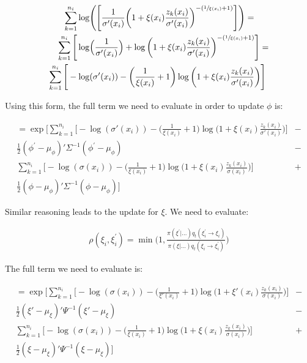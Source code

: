 \documentclass{article}
\begin{document}
\begin{align*}
\sum_{k=1}^{n_i} \log & \Bigg( \Bigg[ \frac{1}{\sigma'(x_i)} \bigg( 1 + \xi(x_i) \frac{z_k(x_i)}{\sigma'(x_i)} \bigg)^{-(\sfrac{1}{\xi(x_i)} + 1)} \Bigg] \Bigg) = \\
\sum_{k=1}^{n_i} \Bigg[ \log & \Big( \frac{1}{\sigma'(x_i)} \Big) + \log \bigg( 1 + \xi(x_i) \frac{z_k(x_i)}{\sigma'(x_i)} \bigg)^{-(\sfrac{1}{\xi(x_i)} + 1)} \Bigg] = \\
\sum_{k=1}^{n_i} \Bigg[ - \log & (\sigma'(x_i)) - \bigg( \frac{1}{\xi(x_i)} + 1 \bigg) \log \bigg( 1 + \xi(x_i) \frac{z_k(x_i)}{\sigma'(x_i)} \bigg) \Bigg]
\end{align*}

Using this form, the full term we need to evaluate in order to update $\phi$ is:

\begin{align}
= \exp \Bigg[ \sum_{k=1}^{n_i} \bigg[ - \log (\sigma'(x_i)) - \bigg( \frac{1}{\xi(x_i)} + 1 \bigg) \log \bigg( 1 + \xi(x_i) \frac{z_k(x_i)}{\sigma'(x_i)} \bigg) \bigg] & - \nonumber \\
\frac{1}{2} (\phi^{'} - \mu_\phi)' \Sigma^{-1} (\phi^{'} - \mu_\phi) & - \nonumber \\
\sum_{k=1}^{n_i} \bigg[ - \log (\sigma(x_i)) - \bigg( \frac{1}{\xi(x_i)} + 1 \bigg) \log \bigg( 1 + \xi(x_i) \frac{z_k(x_i)}{\sigma(x_i)} \bigg) \bigg] & + \nonumber \\
\frac{1}{2} (\phi - \mu_\phi)' \Sigma^{-1} (\phi - \mu_\phi) \Bigg] & \label{3eq:1a}
\end{align}

Similar reasoning leads to the update for $\xi$. We need to evaluate:

\begin{align*}
\rho(\xi_i, \xi^{'}_i) = \min \bigg (1, \frac{\pi(\xi^{'} | \dots ) q_t(\xi^{'}_i \to \xi_i)}{ \pi(\xi | \dots ) q_t(\xi_i \to \xi^{'}_i) } \bigg)
\end{align*}

The full term we need to evaluate is:

\begin{align}
= \exp \Bigg[ \sum_{k=1}^{n_i} \bigg[ - \log (\sigma(x_i)) - \bigg( \frac{1}{\xi'(x_i)} + 1 \bigg) \log \bigg( 1 + \xi'(x_i) \frac{z_k(x_i)}{\sigma(x_i)} \bigg) \bigg] & -\nonumber \\
\frac{1}{2} (\xi' - \mu_\xi)' \Psi^{-1} (\xi' - \mu_\xi) & - \nonumber \\
\sum_{k=1}^{n_i} \bigg[ - \log (\sigma(x_i)) - \bigg( \frac{1}{\xi(x_i)} + 1 \bigg) \log \bigg( 1 + \xi(x_i) \frac{z_k(x_i)}{\sigma(x_i)} \bigg) \bigg] & +\nonumber \\
\frac{1}{2} (\xi - \mu_\xi)' \Psi^{-1} (\xi - \mu_\xi) \Bigg] & \label{3eq:1b}
\end{align}
\end{document}
